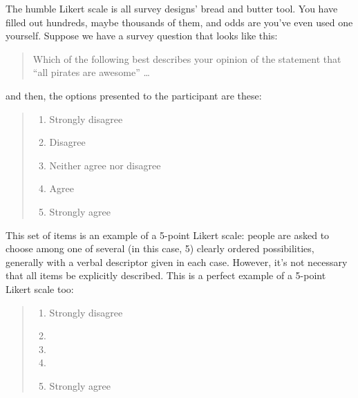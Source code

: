 \documentclass[
  11pt,
  a4paper,
  twoside,symmetric,openright]{book}
\providecommand{\tightlist}{%
  \setlength{\itemsep}{0pt}\setlength{\parskip}{0pt}}
\theoremstyle{break}
\theoremstyle{break}
\begin{document}
The humble Likert scale is all survey designs' bread and butter tool. You have filled out hundreds, maybe thousands of them, and odds are you've even used one yourself. Suppose we have a survey question that looks like this:

\begin{quote}
Which of the following best describes your opinion of the statement that ``all pirates are awesome'' \ldots{}
\end{quote}

\nopagebreak[4]

and then, the options presented to the participant are these:

\begin{keepTogether}

\begin{quote}
\begin{enumerate}
\def\labelenumi{(\arabic{enumi})}
\tightlist
\item
  Strongly disagree
\item
  Disagree
\item
  Neither agree nor disagree
\item
  Agree
\item
  Strongly agree
\end{enumerate}
\end{quote}

\end{keepTogether}

This set of items is an example of a 5-point Likert scale: people are asked to choose among one of several (in this case, 5) clearly ordered possibilities, generally with a verbal descriptor given in each case. However, it's not necessary that all items be explicitly described. This is a perfect example of a 5-point Likert scale too:

\begin{keepTogether}

\begin{quote}
\begin{enumerate}
\def\labelenumi{(\arabic{enumi})}
\tightlist
\item
  Strongly disagree
\item
\item
\item
\item
  Strongly agree
\end{enumerate}
\end{quote}

\end{keepTogether}
\end{document}
